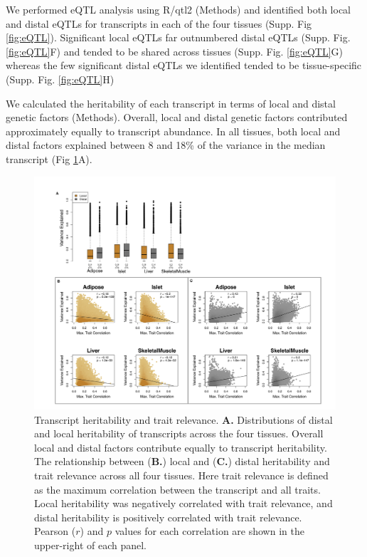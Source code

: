 \documentclass[
]{article}
\begin{document}
We performed eQTL analysis using R/qtl2 \cite{pmid30591514} (Methods)
and identified both local and distal eQTLs for transcripts in each of
the four tissues (Supp. Fig \ref{fig:eQTL}). Significant local eQTLs far
outnumbered distal eQTLs (Supp. Fig. \ref{fig:eQTL}F) and tended to be
shared across tissues (Supp. Fig. \ref{fig:eQTL}G) whereas the few
significant distal eQTLs we identified tended to be tissue-specific
(Supp. Fig. \ref{fig:eQTL}H)

We calculated the heritability of each transcript in terms of local and
distal genetic factors (Methods). Overall, local and distal genetic
factors contributed approximately equally to transcript abundance. In
all tissues, both local and distal factors explained between 8 and 18\%
of the variance in the median transcript (Fig \ref{fig:motivation}A).

\begin{figure}[ht!]
\includegraphics[width=\textwidth]{Figures/Fig2_motivation.pdf} 
\caption{Transcript heritability and trait relevance. 
\textbf{A.} Distributions of distal and local heritability of 
transcripts across the four tissues. Overall local and distal 
factors contribute equally to transcript heritability. The 
relationship between (\textbf{B.}) local and (\textbf{C.}) 
distal heritability and trait relevance across all four tissues. 
Here trait relevance is defined as the maximum correlation between 
the transcript and all traits. Local heritability was negatively 
correlated with trait relevance, and distal heritability is 
positively correlated with trait relevance. Pearson ($r$) and $p$ 
values for each correlation are shown in the upper-right of each panel.}
\label{fig:motivation}
\end{figure}
\end{document}
